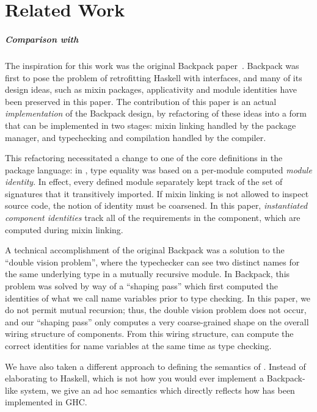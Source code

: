 \chapter{Related Work}

\paragraph{Comparison with \OldBackpack{}}  The inspiration for this
work was the original Backpack paper~\cite{backpack}.  Backpack was
first to pose the problem of retrofitting Haskell with interfaces, and
many of its design ideas, such as mixin packages, applicativity and
module identities have been preserved in this paper.  The contribution
of this paper is an actual \emph{implementation} of the
Backpack design, by refactoring of these ideas into a form that can be
implemented in two stages: mixin linking handled by the package manager,
and typechecking and compilation handled by the compiler.

This refactoring necessitated a change to one of the core definitions
in the package language: in \OldBackpack{}, type equality was based on
a per-module computed \emph{module identity}.  In effect, every
defined module separately kept track of the set of signatures that it
transitively imported.  If mixin linking is not allowed to inspect
source code, the notion of identity must be coarsened. In this paper,
\emph{instantiated component identities} track all of the requirements
in the component, which are computed during mixin linking.

A technical accomplishment of the original Backpack was a solution to
the ``double vision problem'', where the typechecker can see two
distinct names for the same underlying type in a mutually recursive
module.  In Backpack, this problem was solved by way of a ``shaping pass'' which
first computed the identities of what we call name variables prior to type
checking.  In this paper, we do not permit
mutual recursion; thus, the double vision problem does not occur,
and our ``shaping pass'' only computes a very coarse-grained shape
on the overall wiring structure of components.  From this wiring
structure, \Backpack{} can compute the correct identities for
name variables at the same time as type checking.

We have also taken a different approach to defining the semantics of
\Backpack{}.  Instead of elaborating to Haskell, which is not how you would ever
implement a Backpack-like system, we give an ad hoc semantics which
directly reflects how \Backpack{} has been implemented in GHC\@.

